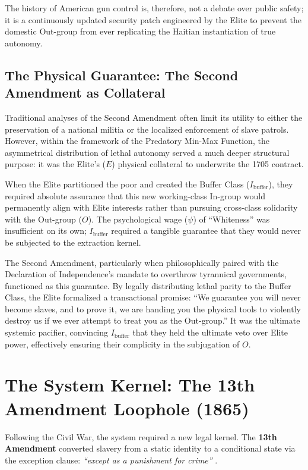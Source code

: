 \documentclass[12pt,openany]{book}
\begin{document}
The history of American gun control is, therefore, not a debate over public safety; it is a continuously updated security patch engineered by the Elite to prevent the domestic Out-group from ever replicating the Haitian instantiation of true autonomy.

\subsection{The Physical Guarantee: The Second Amendment as Collateral}

Traditional analyses of the Second Amendment often limit its utility to either the preservation of a national militia or the localized enforcement of slave patrols. However, within the framework of the Predatory Min-Max Function, the asymmetrical distribution of lethal autonomy served a much deeper structural purpose: it was the Elite's ($E$) physical collateral to underwrite the 1705 contract.

When the Elite partitioned the poor and created the Buffer Class ($I_{\text{buffer}}$), they required absolute assurance that this new working-class In-group would permanently align with Elite interests rather than pursuing cross-class solidarity with the Out-group ($O$). The psychological wage ($\psi$) of ``Whiteness'' was insufficient on its own; $I_{\text{buffer}}$ required a tangible guarantee that they would never be subjected to the extraction kernel.

The Second Amendment, particularly when philosophically paired with the Declaration of Independence's mandate to overthrow tyrannical governments, functioned as this guarantee. By legally distributing lethal parity to the Buffer Class, the Elite formalized a transactional promise: ``We guarantee you will never become slaves, and to prove it, we are handing you the physical tools to violently destroy us if we ever attempt to treat you as the Out-group.'' It was the ultimate systemic pacifier, convincing $I_{\text{buffer}}$ that they held the ultimate veto over Elite power, effectively ensuring their complicity in the subjugation of $O$.

\section{The System Kernel: The 13th Amendment Loophole (1865)}
Following the Civil War, the system required a new legal kernel. The \textbf{13th Amendment} converted slavery from a static identity to a conditional state via the exception clause: \textit{``except as a punishment for crime''} \cite{alexander, blackmon, thirteenth}.
\end{document}
